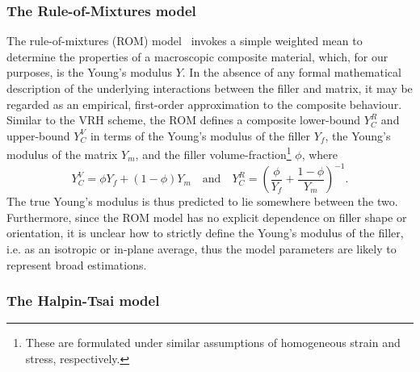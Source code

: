 \subsubsection{The Rule-of-Mixtures model}
%
The rule-of-mixtures (ROM) model~\cite{askeland2011science} 
invokes a simple weighted mean to determine 
the properties of a macroscopic composite material, 
which, for our purposes, is the Young's modulus $Y$.
%
In the absence of any formal mathematical description 
of the underlying interactions 
between the filler and matrix, 
it may be regarded as 
an empirical, first-order approximation 
to the composite behaviour. 
%
Similar to the VRH scheme, 
the ROM defines a composite 
lower-bound $Y^R_C$ 
and upper-bound $Y^V_C$ 
in terms of the Young's modulus of the filler $Y_f$, 
the Young's modulus of the matrix $Y_m$, 
and the filler volume-fraction\footnote{These are formulated under similar 
assumptions of homogeneous 
strain and stress, respectively.} $\phi$, 
where
%
\begin{equation}
Y^V_C=\phi Y_f+ (1-\phi)Y_m 
\quad\mbox{and}\quad
Y^R_C=\left(\frac{\phi}{Y_f}+\frac{1-\phi}{Y_m}\right)^{-1}.
\label{eq:rom_models}
\end{equation}
%
The true Young's modulus is thus 
predicted to lie somewhere between the two.
%
Furthermore, since the ROM model 
has no explicit dependence 
on filler shape or orientation, 
it is unclear how to strictly 
define the Young's modulus of the filler, 
i.e. as an isotropic or in-plane average, 
thus the model parameters 
are likely to represent broad estimations.


\subsubsection{The Halpin-Tsai model}

